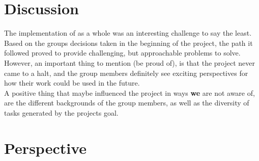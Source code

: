 \section{Discussion}
\iffalse
The main concerns presented by the forums communities were the security levels of the implementation of
this OS. The two main topics were: how to identify an error and how to track it to the origin and how the
system will react to different levels of failure, from small to fatal errors. If the entire system would
reboot, only restart the partition or block it.\\
Other problems suggested were related to the interrupts, when context switching if the next partition
would also have acess to all them, and how the control is made to prevent any errors related.\\
The idea of an OpenSource implementation like this was well accepted due to the lack of examples avaiable.
It was given an example of an implementation in the USA, of a similar system and that is still used for
communication infrastructures.
The whole text is presented in the \nameref{chap:Forum Responces}.
\todo{can't make the refrence work, help!}
\fi

The implementation of \OSname{} as a whole was an interesting challenge
to say the least. Based on the group\textquotesingle s decisions taken in the beginning 
of the project, the path it followed proved to provide challenging, but
approachable problems to solve. However, an important thing to mention
(be proud of), is that the project never came to a halt, and the group 
members definitely see exciting perspectives for how their work could be
used in the future. \\
A positive thing that maybe influenced the project in ways \textbf{we} are 
not aware of, are the different backgrounds of the group members, as well as
the diversity of tasks generated by the project\textquotesingle s goal.

\section{Perspective}
